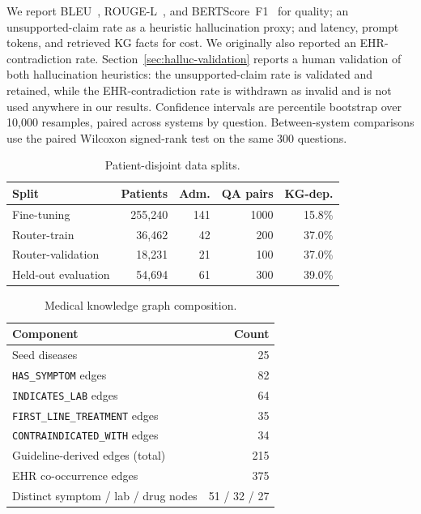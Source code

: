 \documentclass[preprint,12pt]{elsarticle}
\begin{document}
We report BLEU~\cite{papineni2002}, ROUGE-L~\cite{lin2004}, and
BERTScore~F1~\cite{zhang2020} for quality; an unsupported-claim rate as
a heuristic hallucination proxy; and
latency, prompt tokens, and retrieved KG facts for cost. We originally
also reported an EHR-contradiction rate. Section~\ref{sec:halluc-validation}
reports a human validation of both hallucination heuristics: the
unsupported-claim rate is validated and retained, while the
EHR-contradiction rate is withdrawn as invalid and is not used anywhere
in our results. Confidence intervals are percentile bootstrap over
10{,}000 resamples, paired across systems by question. Between-system
comparisons use the paired Wilcoxon signed-rank test on the same 300
questions.

\begin{table}[t]
\centering
\footnotesize
\setlength{\tabcolsep}{4pt}
\caption{Patient-disjoint data splits.}
\label{tab:splits}
\begin{tabular}{lrrrr}
\toprule
Split & Patients & Adm. & QA pairs & KG-dep. \\
\midrule
Fine-tuning        & 255{,}240 & 141 & 1000 & 15.8\% \\
Router-train       &  36{,}462 &  42 &  200 & 37.0\% \\
Router-validation  &  18{,}231 &  21 &  100 & 37.0\% \\
Held-out evaluation&  54{,}694 &  61 &  300 & 39.0\% \\
\bottomrule
\end{tabular}
\end{table}

\begin{table}[t]
\centering
\footnotesize
\setlength{\tabcolsep}{4pt}
\caption{Medical knowledge graph composition.}
\label{tab:mkg}
\begin{tabular}{lr}
\toprule
Component & Count \\
\midrule
Seed diseases                       & 25 \\
\texttt{HAS\_SYMPTOM} edges         & 82 \\
\texttt{INDICATES\_LAB} edges       & 64 \\
\texttt{FIRST\_LINE\_TREATMENT} edges & 35 \\
\texttt{CONTRAINDICATED\_WITH} edges  & 34 \\
\midrule
Guideline-derived edges (total)     & 215 \\
EHR co-occurrence edges             & 375 \\
\midrule
Distinct symptom / lab / drug nodes & 51 / 32 / 27 \\
\bottomrule
\end{tabular}
\end{table}
\end{document}
